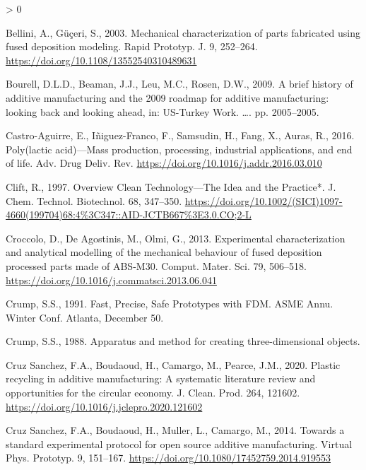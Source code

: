 \documentclass[
]{article}
\newlength{\cslhangindent}
\newenvironment{CSLReferences}[2] %
 {%
  \setlength{\parindent}{0pt}
  \ifodd #1 \everypar{\setlength{\hangindent}{\cslhangindent}}\ignorespaces\fi
  \ifnum #2 > 0
  \setlength{\parskip}{#2\baselineskip}
  \fi
 }%
 {}
\begin{document}
\begin{CSLReferences}{1}{0}
\leavevmode\hypertarget{ref-Bellini2003}{}%
Bellini, A., Güçeri, S., 2003. {Mechanical characterization of parts fabricated using fused deposition modeling}. Rapid Prototyp. J. 9, 252--264. \url{https://doi.org/10.1108/13552540310489631}

\leavevmode\hypertarget{ref-Bourell2009}{}%
Bourell, D.L.D., Beaman, J.J., Leu, M.C., Rosen, D.W., 2009. {A brief history of additive manufacturing and the 2009 roadmap for additive manufacturing: looking back and looking ahead}, in: US-Turkey Work. {\ldots{}}. pp. 2005--2005.

\leavevmode\hypertarget{ref-Castro-Aguirre2016}{}%
Castro-Aguirre, E., Iñiguez-Franco, F., Samsudin, H., Fang, X., Auras, R., 2016. {Poly(lactic acid)---Mass production, processing, industrial applications, and end of life}. Adv. Drug Deliv. Rev. \url{https://doi.org/10.1016/j.addr.2016.03.010}

\leavevmode\hypertarget{ref-Clift1997}{}%
Clift, R., 1997. {Overview Clean Technology---The Idea and the Practice*}. J. Chem. Technol. Biotechnol. 68, 347--350. \url{https://doi.org/10.1002/(SICI)1097-4660(199704)68:4\%3C347::AID-JCTB667\%3E3.0.CO;2-L}

\leavevmode\hypertarget{ref-Croccolo2013}{}%
Croccolo, D., De Agostinis, M., Olmi, G., 2013. {Experimental characterization and analytical modelling of the mechanical behaviour of fused deposition processed parts made of ABS-M30}. Comput. Mater. Sci. 79, 506--518. \url{https://doi.org/10.1016/j.commatsci.2013.06.041}

\leavevmode\hypertarget{ref-Crump1991}{}%
Crump, S.S., 1991. {Fast, Precise, Safe Prototypes with FDM.} ASME Annu. Winter Conf. Atlanta, December 50.

\leavevmode\hypertarget{ref-Crump1988}{}%
Crump, S.S., 1988. {Apparatus and method for creating three-dimensional objects.}

\leavevmode\hypertarget{ref-CruzSanchez2020}{}%
Cruz Sanchez, F.A., Boudaoud, H., Camargo, M., Pearce, J.M., 2020. {Plastic recycling in additive manufacturing: A systematic literature review and opportunities for the circular economy}. J. Clean. Prod. 264, 121602. \url{https://doi.org/10.1016/j.jclepro.2020.121602}

\leavevmode\hypertarget{ref-CruzSanchez2014}{}%
Cruz Sanchez, F.A., Boudaoud, H., Muller, L., Camargo, M., 2014. {Towards a standard experimental protocol for open source additive manufacturing}. Virtual Phys. Prototyp. 9, 151--167. \url{https://doi.org/10.1080/17452759.2014.919553}


\end{CSLReferences}
\end{document}
